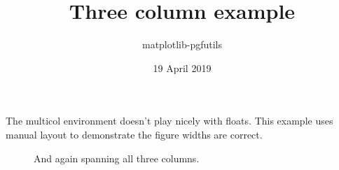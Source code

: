 \documentclass[landscape]{article}
\title{Three column example}
\author{matplotlib-pgfutils}
\date{19 April 2019}
\begin{document}
\maketitle

\begin{center}
  The multicol environment doesn't play nicely with floats.
  This example uses manual layout to demonstrate the figure widths are correct.
\end{center}

\begin{multicols}{3}

\lipsum[1-7]

\noindent
\begin{minipage}[c][0.55\textheight]{\columnwidth}
  
\end{minipage}

\lipsum[9-20]

\noindent
\begin{minipage}[c][0.5\textheight]{2\columnwidth+1\columnsep}
  
\end{minipage}

\lipsum[21]

\lipsum[22][1-12]

\columnbreak\vspace*{0.48\textheight}

\lipsum[23-24]

\begin{figure*}
  
  \caption{And again spanning all three columns.}
\end{figure*}

\lipsum[25-28]

\end{multicols}
\end{document}
